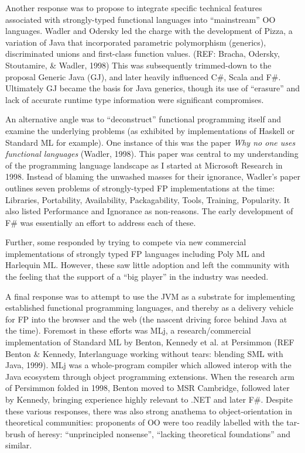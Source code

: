 \documentclass[acmsmall]{acmart}\settopmatter{}
\begin{document}
Another response was to propose to integrate specific technical features associated with strongly-typed functional languages into “mainstream” OO
languages.  Wadler and Odersky led the charge with the development of Pizza, a variation of Java that incorporated parametric polymorphism (generics), discriminated
unions and first-class function values. (REF: Bracha, Odersky, Stoutamire, \& Wadler, 1998)  This was subsequently trimmed-down to the proposal Generic
Java (GJ), and later heavily influenced C\#, Scala and F\#. Ultimately GJ became the basis for Java generics, though its use of “erasure” and lack of accurate
runtime type information were significant compromises. 

An alternative angle was to “deconstruct” functional programming itself and examine the underlying problems (as exhibited by implementations of Haskell
or Standard ML for example). One instance of this was the paper \textit{Why no one uses functional languages} (Wadler, 1998). This paper was central to
my understanding of the programming language landscape as I started at Microsoft Research in 1998.  Instead of blaming the unwashed masses for their
ignorance, Wadler’s paper outlines seven problems of strongly-typed FP implementations at the time: Libraries, Portability, Availability, Packagability, Tools,
Training, Popularity.  It also listed Performance and Ignorance as non-reasons. The early development of F\# was essentially an effort to address each of these.

Further, some responded by trying to compete via new commercial implementations of strongly typed FP languages including Poly ML and Harlequin ML. However,
these saw little adoption and left the community with the feeling that the support of a “big player” in the industry was needed. 

A final response was to attempt to use the JVM as a substrate for implementing established functional programming languages, and thereby as a delivery
vehicle for FP into the browser and the web (the nascent driving force behind Java at the time).  Foremost in these efforts was MLj, a research/commercial
implementation of Standard ML by Benton, Kennedy et al. at Persimmon (REF Benton \& Kennedy, Interlanguage working without tears: blending SML with
Java, 1999).  MLj was a whole-program compiler which allowed interop with the Java ecosystem through object programming extensions. When the research
arm of Persimmon folded in 1998, Benton moved to MSR Cambridge, followed later by Kennedy, bringing experience highly relevant to .NET and later F\#. Despite
these various responses, there was also strong anathema to object-orientation in theoretical communities: proponents of OO were too readily labelled with the
tar-brush of heresy: “unprincipled nonsense”, “lacking theoretical foundations” and similar.  
\end{document}
